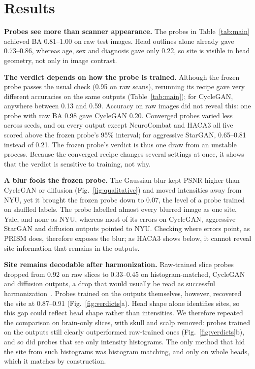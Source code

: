 \documentclass{article}
\begin{document}
\section{Results}
\label{sec:results}
\textbf{Probes see more than scanner appearance.} The probes in Table~\ref{tab:main} achieved BA 0.81--1.00 on raw test images. Head outlines alone already gave 0.73--0.86, whereas age, sex and diagnosis gave only 0.22, so site is visible in head geometry, not only in image contrast.

\textbf{The verdict depends on how the probe is trained.} Although the frozen probe passes the usual check (0.95 on raw scans), rerunning its recipe gave very different accuracies on the same outputs (Table~\ref{tab:main}); for CycleGAN, anywhere between 0.13 and 0.59. Accuracy on raw images did not reveal this: one probe with raw BA 0.98 gave CycleGAN 0.20. Converged probes varied less across seeds, and on every output except NeuroCombat and HACA3 all five scored above the frozen probe's 95\% interval; for aggressive StarGAN, 0.65--0.81 instead of 0.21. The frozen probe's verdict is thus one draw from an unstable process. Because the converged recipe changes several settings at once, it shows that the verdict is sensitive to training, not why.

\textbf{A blur fools the frozen probe.} The Gaussian blur kept PSNR higher than CycleGAN or diffusion (Fig.~\ref{fig:qualitative}) and moved intensities away from NYU, yet it brought the frozen probe down to 0.07, the level of a probe trained on shuffled labels. The probe labelled almost every blurred image as one site, Yale, and none as NYU, whereas most of its errors on CycleGAN, aggressive StarGAN and diffusion outputs pointed to NYU. Checking where errors point, as PRISM does, therefore exposes the blur; as HACA3 shows below, it cannot reveal site information that remains in the outputs.

\textbf{Site remains decodable after harmonization.} Raw-trained slice probes dropped from 0.92 on raw slices to 0.33--0.45 on histogram-matched, CycleGAN and diffusion outputs, a drop that would usually be read as successful harmonization~\cite{galada2025prism}. Probes trained on the outputs themselves, however, recovered the site at 0.87--0.91 (Fig.~\ref{fig:verdicts}a). Head shape alone identifies sites, so this gap could reflect head shape rather than intensities. We therefore repeated the comparison on brain-only slices, with skull and scalp removed: probes trained on the outputs still clearly outperformed raw-trained ones (Fig.~\ref{fig:verdicts}b), and so did probes that see only intensity histograms. The only method that hid the site from such histograms was histogram matching, and only on whole heads, which it matches by construction.
\end{document}
